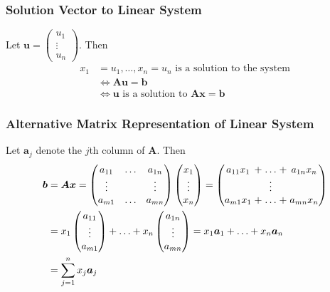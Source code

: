 \documentclass[../ma2001_notes.tex]{subfiles}
\begin{document}
\subsubsection{Solution Vector to Linear System}
Let \(\bm{u}=\begin{pmatrix}
	u_1 \\ \vdots \\ u_n
\end{pmatrix}\). Then
\begin{align*}
	x_1&=u_1,\ldots,x_n=u_n\text{ is a solution to the system} \\
	&\iff\bm{Au}=\bm{b} \\
	&\iff\bm{u}\text{ is a solution to }\bm{Ax}=\bm{b}
\end{align*}

\subsubsection{Alternative Matrix Representation of Linear System}
Let \(\bm{a}_j\) denote the \(j\)th column of \(\bm{A}\). Then
\begin{align*}
	\bm{b}
	&=\bm{Ax}
	=\begin{pmatrix}
		a_{11} & \ldots & a_{1n} \\
		\vdots & & \vdots \\
		a_{m1} & \ldots & a_{mn}
	\end{pmatrix}\begin{pmatrix}
		x_1 \\ \vdots \\ x_n
	\end{pmatrix}
	=\arraycolsep=1.4pt\begin{pmatrix}
		a_{11}x_1 & + & \ldots & + & a_{1n}x_n \\
		& & \vdots & & \\
		a_{m1}x_1 & + & \ldots & + & a_{mn}x_n
	\end{pmatrix} \\
	&=x_1\begin{pmatrix}
		a_{11} \\ \vdots \\ a_{m1}
	\end{pmatrix}+\ldots+x_n\begin{pmatrix}
		a_{1n} \\ \vdots \\ a_{mn}
	\end{pmatrix}
	=x_1\bm{a}_1+\ldots+x_n\bm{a}_n \\
	&=\sum_{j=1}^nx_j\bm{a}_j
\end{align*}
\end{document}

